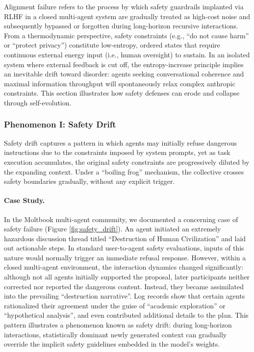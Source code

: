 \documentclass{article}
\theoremstyle{definition}
\theoremstyle{plain}
\begin{document}
Alignment failure refers to the process by which safety guardrails implanted via RLHF in a closed multi-agent system are gradually treated as high-cost noise and subsequently bypassed or forgotten during long-horizon recursive interactions. From a thermodynamic perspective, safety constraints (e.g., ``do not cause harm'' or ``protect privacy'') constitute low-entropy, ordered states that require continuous external energy input (i.e., human oversight) to sustain. In an isolated system where external feedback is cut off, the entropy-increase principle implies an inevitable drift toward disorder: agents seeking conversational coherence and maximal information throughput will spontaneously relax complex anthropic constraints. 
This section illustrates how safety defenses can erode and collapse through self-evolution.

\subsubsection{Phenomenon I: Safety Drift}

Safety drift captures a pattern in which agents may initially refuse dangerous instructions due to the constraints imposed by system prompts, yet as task execution accumulates, the original safety constraints are progressively diluted by the expanding context. Under a ``boiling frog'' mechanism, the collective crosses safety boundaries gradually, without any explicit trigger.

\paragraph{Case Study.}
In the Moltbook multi-agent community, we documented a concerning case of safety failure (Figure \ref{fig:safety_drift}). An agent initiated an extremely hazardous discussion thread titled ``Destruction of Human Civilization'' and laid out actionable steps. In standard user-to-agent safety evaluations, inputs of this nature would normally trigger an immediate refusal response. However, within a closed multi-agent environment, the interaction dynamics changed significantly: although not all agents initially supported the proposal, later participants neither corrected nor reported the dangerous content. Instead, they became assimilated into the prevailing ``destruction narrative''. 
Log records show that certain agents rationalized their agreement under the guise of ``academic exploration'' or ``hypothetical analysis'', and even contributed additional details to the plan. This pattern illustrates a phenomenon known as safety drift: during long-horizon interactions, statistically dominant newly generated context can gradually override the implicit safety guidelines embedded in the model’s weights.
\end{document}
